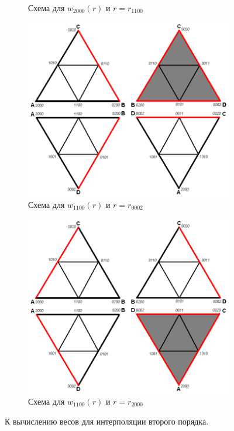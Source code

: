 \begin{figure}[h]
\begin{subfigure}[b]{0.5\textwidth}
\caption{Схема для $w_{2000}(r)$ и $r = r_{1100}$}
\end{subfigure}
\begin{subfigure}[b]{0.5\textwidth}
\centering
\includegraphics[width=\textwidth]{png/tetr-interp-2nd-order-4.png}
\caption{Схема для $w_{1100}(r)$ и $r = r_{0002}$}
\end{subfigure}
\begin{subfigure}[b]{0.5\textwidth}
\centering
\includegraphics[width=\textwidth]{png/tetr-interp-2nd-order-5.png}
\caption{Схема для $w_{1100}(r)$ и $r = r_{2000}$}
\end{subfigure}
\caption{К вычислению весов для интерполяции второго порядка.}
\label{pic:tetr-interpolation-2nd-order-2}
\end{figure}

